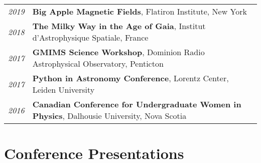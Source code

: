 \documentclass[10pt]{res} %
\begin{document}
\begin{resume}
\begin{table}[h!]
\begin{tabularx}{\textwidth}{lX}
 \textit{2019} & \textbf{Big Apple Magnetic Fields}, Flatiron Institute, New York \\
\textit{2018} & \textbf{The Milky Way in the Age of Gaia}, Institut d'Astrophysique Spatiale, France \\
\textit{2017} & \textbf{GMIMS Science Workshop}, Dominion Radio Astrophysical Observatory, Penticton \\
\textit{2017} & \textbf{Python in Astronomy Conference}, Lorentz Center, Leiden University \\
\textit{2016} & \textbf{Canadian Conference for Undergraduate Women in Physics}, Dalhousie University, Nova Scotia
\end{tabularx}
\end{table}


\section{\Large Conference Presentations}
\vspace{-5pt} %
\noindent\makebox[\linewidth]{\rule{\textwidth}{0.4pt}}
\vspace{-20pt} %


\end{resume}
\end{document}
